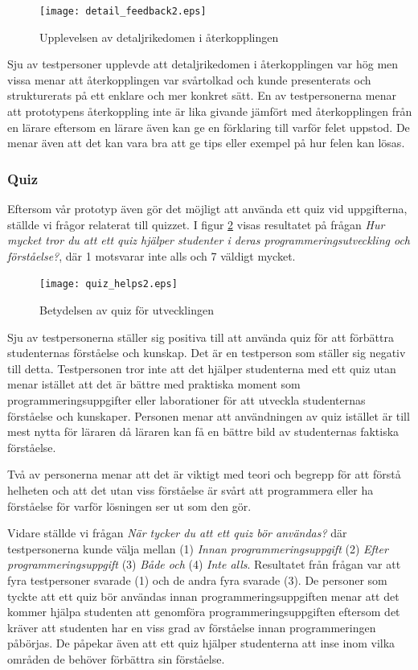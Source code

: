 \documentclass[a4paper,11pt]{article}
\begin{document}
{\begin{figure}[ht!]
\centering
\texttt{[image: detail\_feedback2.eps]}
\caption{Upplevelsen av detaljrikedomen i återkopplingen}
\label{fig:DetailFeedback}
\end{figure}

Sju av testpersoner upplevde att detaljrikedomen i återkopplingen var hög men vissa menar att återkopplingen var svårtolkad och kunde presenterats och strukturerats på ett enklare och mer konkret sätt. En av testpersonerna menar att prototypens återkoppling inte är lika givande jämfört med återkopplingen från en lärare eftersom en lärare även kan ge en förklaring till varför felet uppstod. De menar även att det kan vara bra att ge tips eller exempel på hur felen kan lösas.

\subsubsection{Quiz}

Eftersom vår prototyp även gör det möjligt att använda ett quiz vid uppgifterna, ställde vi frågor relaterat till quizzet. I figur \ref{fig:QuizHelps} visas resultatet på frågan \textit{Hur mycket tror du att ett quiz hjälper studenter i deras programmeringsutveckling och förståelse?}, där 1 motsvarar inte alls och 7 väldigt mycket.

\begin{figure}[ht!]
\centering
\texttt{[image: quiz\_helps2.eps]}
\caption{Betydelsen av quiz för utvecklingen}
\label{fig:QuizHelps}
\end{figure}

Sju av testpersonerna ställer sig positiva till att använda quiz för att förbättra studenternas förståelse och kunskap. Det är en testperson som ställer sig negativ till detta. Testpersonen tror inte att det hjälper studenterna med ett quiz utan menar istället att det är bättre med praktiska moment som programmeringsuppgifter eller laborationer för att utveckla studenternas förståelse och kunskaper. Personen menar att användningen av quiz istället är till mest nytta för läraren då läraren kan få en bättre bild av studenternas faktiska förståelse.

Två av personerna menar att det är viktigt med teori och begrepp för att förstå helheten och att det utan viss förståelse är svårt att programmera eller ha förståelse för varför lösningen ser ut som den gör.

Vidare ställde vi frågan \textit{När tycker du att ett quiz bör användas?} där testpersonerna kunde välja mellan (1) \textit{Innan programmeringsuppgift} (2) \textit{Efter programmeringsuppgift} (3) \textit{Både och} (4) \textit{Inte alls}. Resultatet från frågan var att fyra testpersoner svarade (1) och de andra fyra svarade (3). De personer som tyckte att ett quiz bör användas innan  programmeringsuppgiften menar att det kommer hjälpa studenten att genomföra programmeringsuppgiften eftersom det kräver att studenten har en viss grad av förståelse innan programmeringen påbörjas. De påpekar även att ett quiz hjälper studenterna att inse inom vilka områden de behöver förbättra sin förståelse. 

}
\end{document}

